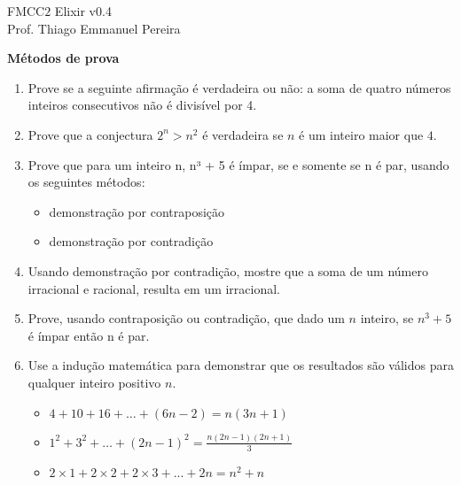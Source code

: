 \documentclass[]{book}
\theoremstyle{definition}
\begin{document}
\begin{center}
{\Large FMCC$2$ Elixir v0.4}\\
Prof. Thiago Emmanuel Pereira
\end{center}

\vspace{0.2 cm}

\textbf{Métodos de prova}

\begin{enumerate}

\item\label{caushw} Prove se a seguinte afirmação é verdadeira ou não: a soma de quatro números inteiros consecutivos não é divisível por 4.

\item\label{caushw} Prove que a conjectura $2^{n} > n^{2}$ \'{e} verdadeira se $n$ \'{e} um inteiro maior que $4$.

\item\label{caushw} Prove que para um inteiro n, n³ + 5 é ímpar, se e somente se n é par, usando os seguintes métodos:

\begin{itemize}
\item demonstração por contraposição
\item demonstração por contradição
\end{itemize}

\item\label{caushw} Usando demonstração por contradição, mostre que a soma de um número irracional e racional, resulta em um irracional.

\item\label{caushw} Prove, usando contraposi\c{c}\~{a}o ou contradi\c{c}\~{a}o, que dado um $n$ inteiro, se $n^{3} + 5$ \'{e} \'{i}mpar ent\~{a}o {n} \'{e} par.

\item\label{caushw} Use a indução matemática para demonstrar que os resultados são válidos para qualquer inteiro positivo $n$.

\begin{itemize}
\item $4 + 10 + 16 + … + (6n - 2) = n(3n + 1)$
\item $1^{2} + 3^{2} + … + (2n - 1)^{2} = \frac{n(2n - 1)(2n + 1)}{3}$
\item $ 2 \times 1 + 2 \times 2 + 2 \times 3 + ... + 2n = n^{2} + n$
\end{itemize}


\end{enumerate}
\end{document}
